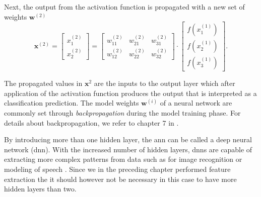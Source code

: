 Next, the output from the activation function is propagated with a new set of weights $\mathbf{w}^{(2)}$
\begin{equation}
	\mathbf{x}^{(2)}=\begin{bmatrix}x_1^{(2)} \\ x_2^{(2)} \end{bmatrix} = 
	\begin{bmatrix} w_{11}^{(2)} & w_{21}^{(2)} & w_{31}^{(2)} \\ w_{12}^{(2)} & w_{22}^{(2)} & w_{32}^{(2)} \end{bmatrix}\cdot \begin{bmatrix}f(x_1^{(1)}) \\ f(x_2^{(1)}) \\ f(x_3^{(1)}) \end{bmatrix}.
\end{equation}

The propagated values in $\mathbf{x}^2$ are the inputs to the output layer which after application of the activation function produces the output that is interpreted as a classification prediction. The model weights $\mathbf{w}^{(i)}$ of a neural network are commonly set through \textit{backpropagation} during the model training phase. For details about backpropagation, we refer to chapter 7 in \citep{rojas_1996}.

By introducing more than one hidden layer, the \gls{ann} can be called a deep neural network (\gls{dnn}). With the increased number of hidden layers, \gls{dnn}s are capable of extracting more complex patterns from data such as for image recognition \citep{szegedy_liu_jia_sermanet_reed_anguelov_erhan_vanhoucke_rabinovich_2018} or modeling of speech \citep{hinton_deng_yu_dahl_mohamed_jaitly_senior_vanhoucke_nguyen_sainath_2012}. Since we in the preceding chapter performed feature extraction the it should however not be necessary in this case to have more hidden layers than two.


